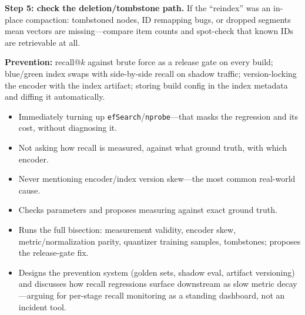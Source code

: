\begin{interviewq}
\textbf{Step 5: check the deletion/tombstone path.} If the ``reindex'' was an in-place compaction: tombstoned nodes, ID remapping bugs, or dropped segments mean vectors are missing---compare item counts and spot-check that known IDs are retrievable at all.

\textbf{Prevention:} recall@$k$ against brute force as a release gate on every build; blue/green index swaps with side-by-side recall on shadow traffic; version-locking the encoder with the index artifact; storing build config in the index metadata and diffing it automatically.

\redflags
\begin{itemize}
    \item Immediately turning up \texttt{efSearch}/\texttt{nprobe}---that masks the regression and its cost, without diagnosing it.
    \item Not asking how recall is measured, against what ground truth, with which encoder.
    \item Never mentioning encoder/index version skew---the most common real-world cause.
\end{itemize}


\goodgreat
\begin{itemize}
    \item {} Checks parameters and proposes measuring against exact ground truth.
    \item {} Runs the full bisection: measurement validity, encoder skew, metric/normalization parity, quantizer training samples, tombstones; proposes the release-gate fix.
    \item {} Designs the prevention system (golden sets, shadow eval, artifact versioning) and discusses how recall regressions surface downstream as slow metric decay---arguing for per-stage recall monitoring as a standing dashboard, not an incident tool.
\end{itemize}

\end{interviewq}


